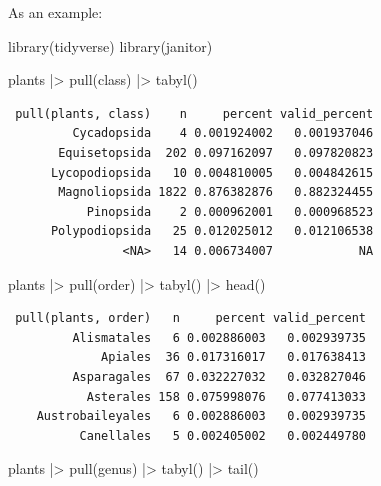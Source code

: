 \documentclass[
  letterpaper,
  DIV=11,
  numbers=noendperiod,
  oneside]{scrreprt}
\newenvironment{Shaded}{\begin{snugshade}}{\end{snugshade}}
\newcommand{\FunctionTok}[1]{\textcolor[rgb]{0.28,0.35,0.67}{#1}}
\newcommand{\NormalTok}[1]{\textcolor[rgb]{0.00,0.23,0.31}{#1}}
\newcommand{\SpecialCharTok}[1]{\textcolor[rgb]{0.37,0.37,0.37}{#1}}
\begin{document}
As an example:

\begin{Shaded}
\begin{Highlighting}[]
\FunctionTok{library}\NormalTok{(tidyverse)}
\FunctionTok{library}\NormalTok{(janitor)}

\NormalTok{plants }\SpecialCharTok{|\textgreater{}} 
  \FunctionTok{pull}\NormalTok{(class) }\SpecialCharTok{|\textgreater{}} 
  \FunctionTok{tabyl}\NormalTok{()}
\end{Highlighting}
\end{Shaded}

\begin{verbatim}
 pull(plants, class)    n     percent valid_percent
         Cycadopsida    4 0.001924002   0.001937046
       Equisetopsida  202 0.097162097   0.097820823
      Lycopodiopsida   10 0.004810005   0.004842615
       Magnoliopsida 1822 0.876382876   0.882324455
           Pinopsida    2 0.000962001   0.000968523
      Polypodiopsida   25 0.012025012   0.012106538
                <NA>   14 0.006734007            NA
\end{verbatim}

\begin{Shaded}
\begin{Highlighting}[]
\NormalTok{plants }\SpecialCharTok{|\textgreater{}} 
  \FunctionTok{pull}\NormalTok{(order) }\SpecialCharTok{|\textgreater{}} 
  \FunctionTok{tabyl}\NormalTok{() }\SpecialCharTok{|\textgreater{}} 
  \FunctionTok{head}\NormalTok{()}
\end{Highlighting}
\end{Shaded}

\begin{verbatim}
 pull(plants, order)   n     percent valid_percent
         Alismatales   6 0.002886003   0.002939735
             Apiales  36 0.017316017   0.017638413
         Asparagales  67 0.032227032   0.032827046
           Asterales 158 0.075998076   0.077413033
    Austrobaileyales   6 0.002886003   0.002939735
          Canellales   5 0.002405002   0.002449780
\end{verbatim}

\begin{Shaded}
\begin{Highlighting}[]
\NormalTok{plants }\SpecialCharTok{|\textgreater{}} 
  \FunctionTok{pull}\NormalTok{(genus) }\SpecialCharTok{|\textgreater{}} 
  \FunctionTok{tabyl}\NormalTok{() }\SpecialCharTok{|\textgreater{}} 
  \FunctionTok{tail}\NormalTok{()}
\end{Highlighting}
\end{Shaded}
\end{document}
